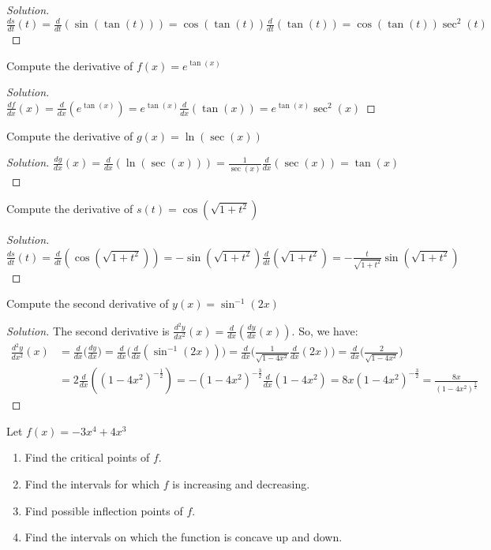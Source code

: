 \documentclass[crop=false,class=book]{standalone}
\begin{document}
\begin{proof}[Solution]
$\frac{ds}{dt}(t)=\frac{d}{dt}(\sin(\tan(t)))=\cos(\tan(t))\frac{d}{dt}(\tan(t))=\cos(\tan(t))\sec^{2}(t)$
\end{proof}
\begin{problem}
Compute the derivative of $f(x)=e^{\tan(x)}$
\end{problem}
\begin{proof}[Solution]
$\frac{df}{dx}(x)=\frac{d}{dx}(e^{\tan(x)})=e^{\tan(x)}\frac{d}{dx}(\tan(x))=e^{\tan(x)}\sec^{2}(x)$
\end{proof}
\begin{problem}
Compute the derivative of $g(x)=\ln(\sec(x))$
\end{problem}
\begin{proof}[Solution]
$\frac{dg}{dx}(x)=\frac{d}{dx}(\ln(\sec(x)))=\frac{1}{\sec(x)}\frac{d}{dx}(\sec(x))=\tan(x)$
\end{proof}
\begin{problem}
Compute the derivative of $s(t)=\cos(\sqrt{1+t^{2}})$
\end{problem}
\begin{proof}[Solution]
$\frac{ds}{dt}(t)=\frac{d}{dt}(\cos(\sqrt{1+t^{2}}))=-\sin(\sqrt{1+t^{2}})\frac{d}{dt}(\sqrt{1+t^{2}})=-\frac{t}{\sqrt{1+t^{2}}}\sin(\sqrt{1+t^{2}})$
\end{proof}
\begin{problem}
Compute the second derivative of $y(x)=\sin^{-1}(2x)$
\end{problem}
\begin{proof}[Solution]
The second derivative is $\frac{d^{2}y}{dx^{2}}(x)=\frac{d}{dx}(\frac{dy}{dx}(x))$. So, we have:
\begin{align*}
    \frac{d^{2}y}{dx^{2}}(x)&=\frac{d}{dx}\big(\frac{dy}{dx}\big)=\frac{d}{dx}\big(\frac{d}{dx}(\sin^{-1}(2x))\big)=\frac{d}{dx}\big(\frac{1}{\sqrt{1-4x^{2}}}\frac{d}{dx}(2x)\big)=\frac{d}{dx}\big(\frac{2}{\sqrt{1-4x^{2}}}\big)\\
    &=2\frac{d}{dx}((1-4x^{2})^{-\frac{1}{2}})=-(1-4x^{2})^{-\frac{3}{2}}\frac{d}{dx}(1-4x^{2})=8x(1-4x^{2})^{-\frac{3}{2}}=\frac{8x}{(1-4x^{2})^{\frac{3}{2}}}
\end{align*}
\end{proof}
\begin{problem}
Let $f(x)=-3x^{4}+4x^{3}$
\begin{enumerate}
    \item Find the critical points of $f$.
    \item Find the intervals for which $f$ is increasing and decreasing.
    \item Find possible inflection points of $f$.
    \item Find the intervals on which the function is concave up and down.
\end{enumerate}
\end{problem}
\end{document}
